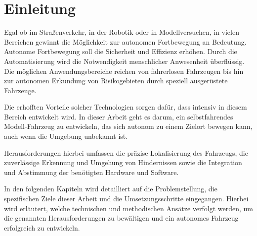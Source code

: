 \section{Einleitung}

Egal ob im Straßenverkehr, in der Robotik oder in Modellversuchen, in vielen Bereichen gewinnt die Möglichkeit zur autonomen Fortbewegung an Bedeutung. 
Autonome Fortbewegung soll die Sicherheit und Effizienz erhöhen. 
Durch die Automatisierung wird die Notwendigkeit menschlicher Anwesenheit überflüssig. 
Die möglichen Anwendungsbereiche reichen von fahrerlosen Fahrzeugen bis hin zur autonomen Erkundung von Risikogebieten durch speziell ausgerüstete Fahrzeuge.

Die erhofften Vorteile solcher Technologien sorgen dafür, dass intensiv in diesem Bereich entwickelt wird. 
In dieser Arbeit geht es darum, ein selbstfahrendes Modell-Fahrzeug zu entwickeln, das sich autonom zu einem Zielort bewegen kann, auch wenn die Umgebung unbekannt ist.

Herausforderungen hierbei umfassen die präzise Lokalisierung des Fahrzeugs, 
die zuverlässige Erkennung und Umgehung von Hindernissen sowie die Integration und Abstimmung der benötigten Hardware und Software.

In den folgenden Kapiteln wird detailliert auf die Problemstellung, die spezifischen Ziele dieser Arbeit und die Umsetzungsschritte eingegangen. 
Hierbei wird erläutert, welche technischen und methodischen Ansätze verfolgt werden, um die genannten Herausforderungen zu bewältigen und ein autonomes Fahrzeug erfolgreich zu entwickeln.